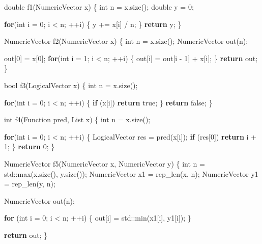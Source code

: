 \documentclass[
]{krantz}
\makeatletter
\newenvironment{Shaded}{\begin{snugshade}}{\end{snugshade}}
\newcommand{\BuiltInTok}[1]{#1}
\newcommand{\ControlFlowTok}[1]{\textcolor[rgb]{0.13,0.29,0.53}{\textbf{#1}}}
\newcommand{\DataTypeTok}[1]{\textcolor[rgb]{0.13,0.29,0.53}{#1}}
\newcommand{\DecValTok}[1]{\textcolor[rgb]{0.00,0.00,0.81}{#1}}
\newcommand{\KeywordTok}[1]{\textcolor[rgb]{0.13,0.29,0.53}{\textbf{#1}}}
\newcommand{\NormalTok}[1]{#1}
\newenvironment{kframe}{%
\medskip{}
\setlength{\fboxsep}{.8em}
 \def\at@end@of@kframe{}%
 \ifinner\ifhmode%
  \def\at@end@of@kframe{\end{minipage}}%
  \begin{minipage}{\columnwidth}%
 \fi\fi%
 \def\FrameCommand##1{\hskip\@totalleftmargin \hskip-\fboxsep
 \colorbox{shadecolor}{##1}\hskip-\fboxsep
     \hskip-\linewidth \hskip-\@totalleftmargin \hskip\columnwidth}%
 \MakeFramed {\advance\hsize-\width
   \@totalleftmargin\z@ \linewidth\hsize
   \@setminipage}}%
 {\par\unskip\endMakeFramed%
 \at@end@of@kframe}
\renewenvironment{Shaded}{\begin{kframe}}{\end{kframe}}
\renewcommand{\KeywordTok} [1]{\textcolor[rgb]{0.00,0.44,0.13}{{#1}}}
\renewcommand{\DataTypeTok}[1]{\textcolor[rgb]{0.56,0.13,0.00}{{#1}}}
\renewcommand{\DecValTok}  [1]{\textcolor[rgb]{0.25,0.63,0.44}{{#1}}}
\renewcommand{\NormalTok}  [1]{{#1}}
\makeatother
\begin{document}
\begin{Shaded}
\begin{Highlighting}[]
\DataTypeTok{double}\NormalTok{ f1(NumericVector x) \{}
  \DataTypeTok{int}\NormalTok{ n = x.size();}
  \DataTypeTok{double}\NormalTok{ y = }\DecValTok{0}\NormalTok{;}
  
  \ControlFlowTok{for}\NormalTok{(}\DataTypeTok{int}\NormalTok{ i = }\DecValTok{0}\NormalTok{; i < n; ++i) \{}
\NormalTok{    y += x[i] / n;}
\NormalTok{  \}}
  \ControlFlowTok{return}\NormalTok{ y;}
\NormalTok{\}}

\NormalTok{NumericVector f2(NumericVector x) \{}
  \DataTypeTok{int}\NormalTok{ n = x.size();}
\NormalTok{  NumericVector out(n);}
  
\NormalTok{  out[}\DecValTok{0}\NormalTok{] = x[}\DecValTok{0}\NormalTok{];}
  \ControlFlowTok{for}\NormalTok{(}\DataTypeTok{int}\NormalTok{ i = }\DecValTok{1}\NormalTok{; i < n; ++i) \{}
\NormalTok{    out[i] = out[i - }\DecValTok{1}\NormalTok{] + x[i];}
\NormalTok{  \}}
  \ControlFlowTok{return}\NormalTok{ out;}
\NormalTok{\}}

\DataTypeTok{bool}\NormalTok{ f3(LogicalVector x) \{}
  \DataTypeTok{int}\NormalTok{ n = x.size();}
  
  \ControlFlowTok{for}\NormalTok{(}\DataTypeTok{int}\NormalTok{ i = }\DecValTok{0}\NormalTok{; i < n; ++i) \{}
    \ControlFlowTok{if}\NormalTok{ (x[i]) }\ControlFlowTok{return} \KeywordTok{true}\NormalTok{;}
\NormalTok{  \}}
  \ControlFlowTok{return} \KeywordTok{false}\NormalTok{;}
\NormalTok{\}}

\DataTypeTok{int}\NormalTok{ f4(Function pred, List x) \{}
  \DataTypeTok{int}\NormalTok{ n = x.size();}
  
  \ControlFlowTok{for}\NormalTok{(}\DataTypeTok{int}\NormalTok{ i = }\DecValTok{0}\NormalTok{; i < n; ++i) \{}
\NormalTok{    LogicalVector res = pred(x[i]);}
    \ControlFlowTok{if}\NormalTok{ (res[}\DecValTok{0}\NormalTok{]) }\ControlFlowTok{return}\NormalTok{ i + }\DecValTok{1}\NormalTok{;}
\NormalTok{  \}}
  \ControlFlowTok{return} \DecValTok{0}\NormalTok{;}
\NormalTok{\}}

\NormalTok{NumericVector f5(NumericVector x, NumericVector y) \{}
  \DataTypeTok{int}\NormalTok{ n = }\BuiltInTok{std::}\NormalTok{max(x.size(), y.size());}
\NormalTok{  NumericVector x1 = rep_len(x, n);}
\NormalTok{  NumericVector y1 = rep_len(y, n);}
  
\NormalTok{  NumericVector out(n);}
  
  \ControlFlowTok{for}\NormalTok{ (}\DataTypeTok{int}\NormalTok{ i = }\DecValTok{0}\NormalTok{; i < n; ++i) \{}
\NormalTok{    out[i] = }\BuiltInTok{std::}\NormalTok{min(x1[i], y1[i]);}
\NormalTok{  \}}
  
  \ControlFlowTok{return}\NormalTok{ out;}
\NormalTok{\}}
\end{Highlighting}
\end{Shaded}
\end{document}
